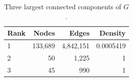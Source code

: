 \begin{table}[t]
\centering
\caption{Three largest connected components of $G$.}
\label{tab:components}
\begin{tabular}{lrrr}
\toprule
Rank & Nodes & Edges & Density \\
\midrule
1 & 133,689 & 4,842,151 & 0.0005419 \\
2 & 50 & 1,225 & 1 \\
3 & 45 & 990 & 1 \\
\bottomrule
\end{tabular}
\end{table}
